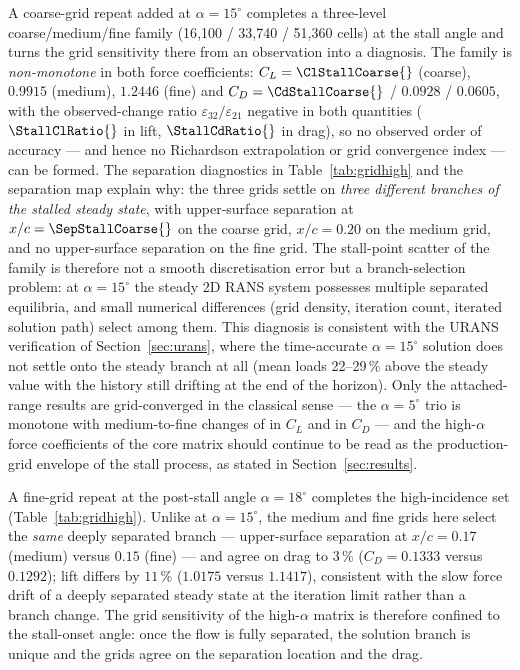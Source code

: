 \documentclass[11pt,a4paper]{article}
\begin{document}
A coarse-grid repeat added at $\alpha = 15^\circ$ completes a three-level coarse/medium/fine family (16{,}100 / 33{,}740 / 51{,}360 cells) at the stall angle and turns the grid sensitivity there from an observation into a diagnosis. The family is \emph{non-monotone} in both force coefficients: $C_L = \ClStallCoarse{}$ (coarse), $0.9915$ (medium), $1.2446$ (fine) and $C_D = \CdStallCoarse{}$ / $0.0928$ / $0.0605$, with the observed-change ratio $\varepsilon_{32}/\varepsilon_{21}$ negative in both quantities ($\StallClRatio{}$ in lift, $\StallCdRatio{}$ in drag), so no observed order of accuracy --- and hence no Richardson extrapolation or grid convergence index --- can be formed. The separation diagnostics in Table~\ref{tab:gridhigh} and the separation map explain why: the three grids settle on \emph{three different branches of the stalled steady state}, with upper-surface separation at $x/c = \SepStallCoarse{}$ on the coarse grid, $x/c = 0.20$ on the medium grid, and no upper-surface separation on the fine grid. The stall-point scatter of the family is therefore not a smooth discretisation error but a branch-selection problem: at $\alpha = 15^\circ$ the steady 2D RANS system possesses multiple separated equilibria, and small numerical differences (grid density, iteration count, iterated solution path) select among them. This diagnosis is consistent with the URANS verification of Section~\ref{sec:urans}, where the time-accurate $\alpha = 15^\circ$ solution does not settle onto the steady branch at all (mean loads 22--29\,\% above the steady value with the history still drifting at the end of the horizon). Only the attached-range results are grid-converged in the classical sense --- the $\alpha = 5^\circ$ trio is monotone with medium-to-fine changes of \ClGridDelta{} in $C_L$ and \CdGridDelta{} in $C_D$ --- and the high-$\alpha$ force coefficients of the core matrix should continue to be read as the production-grid envelope of the stall process, as stated in Section~\ref{sec:results}.

A fine-grid repeat at the post-stall angle $\alpha = 18^\circ$ completes the high-incidence set (Table~\ref{tab:gridhigh}). Unlike at $\alpha = 15^\circ$, the medium and fine grids here select the \emph{same} deeply separated branch --- upper-surface separation at $x/c = 0.17$ (medium) versus $0.15$ (fine) --- and agree on drag to $3\,\%$ ($C_D = 0.1333$ versus $0.1292$); lift differs by $11\,\%$ ($1.0175$ versus $1.1417$), consistent with the slow force drift of a deeply separated steady state at the iteration limit rather than a branch change. The grid sensitivity of the high-$\alpha$ matrix is therefore confined to the stall-onset angle: once the flow is fully separated, the solution branch is unique and the grids agree on the separation location and the drag.
\end{document}
